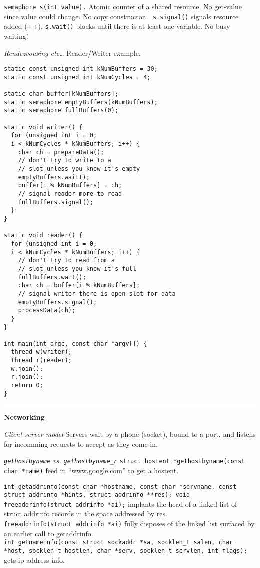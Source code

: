\documentclass{article}
\begin{document}
\begin{multicols}{2}
  {\tt semaphore s(int value).} Atomic counter of a shared resource. No
  get-value since value could change. No copy constructor. {\tt
  s.signal()} signals resource added (++), {\tt s.wait()} blocks until there is
  at least one variable. No busy waiting!

  {\it Rendezvousing etc\ldots} Reader/Writer example.
  \begin{verbatim}
static const unsigned int kNumBuffers = 30;
static const unsigned int kNumCycles = 4;

static char buffer[kNumBuffers];
static semaphore emptyBuffers(kNumBuffers);
static semaphore fullBuffers(0);

static void writer() {
  for (unsigned int i = 0;
  i < kNumCycles * kNumBuffers; i++) {
    char ch = prepareData();
    // don't try to write to a
    // slot unless you know it's empty
    emptyBuffers.wait();
    buffer[i % kNumBuffers] = ch;
    // signal reader more to read
    fullBuffers.signal();
  }
}

static void reader() {
  for (unsigned int i = 0;
  i < kNumCycles * kNumBuffers; i++) {
    // don't try to read from a
    // slot unless you know it's full
    fullBuffers.wait();
    char ch = buffer[i % kNumBuffers];
    // signal writer there is open slot for data
    emptyBuffers.signal();
    processData(ch);
  }
}

int main(int argc, const char *argv[]) {
  thread w(writer);
  thread r(reader);
  w.join();
  r.join();
  return 0;
}
  \end{verbatim}

  \noindent\rule{4cm}{0.4pt}

  {\bf Networking}

  {\it Client-server model} Servers wait by a phone (socket), bound to a port,
  and listens for incomming requests to accept as they come in.

  {\it {\tt gethostbyname} vs. {\tt gethostbyname\_r}}
  {\tt struct hostent *gethostbyname(const char *name)} feed in
  ``www.google.com'' to get a hostent. %

  {\tt int getaddrinfo(const char *hostname, const char *servname,
  const struct addrinfo *hints, struct addrinfo **res);
  void freeaddrinfo(struct addrinfo *ai);} implants the head of a
  linked list of struct addrinfo records in the space addressed by
  res.\\
  {\tt freeaddrinfo(struct addrinfo *ai)} fully disposes of the linked list
  surfaced by an earlier call to getaddrinfo.\\
  {\tt int getnameinfo(const struct sockaddr *sa, socklen\_t salen,
  char *host, socklen\_t hostlen,
  char *serv, socklen\_t servlen, int flags);} gets ip address info.


\end{multicols}
\end{document}
